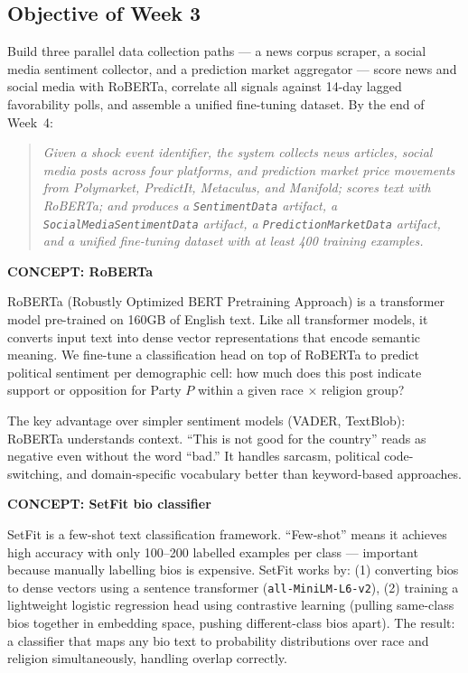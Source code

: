 \documentclass[11pt]{article}
\newcommand{\concept}[2]{%
  \begin{mdframed}[style=conceptbox]
  {\small\bfseries\color{bluefg}CONCEPT: #1}\par\smallskip #2
  \end{mdframed}}
\begin{document}
\subsection*{Objective of Week 3}

Build three parallel data collection paths --- a news corpus scraper, a social media
sentiment collector, and a prediction market aggregator --- score news and social media
with RoBERTa, correlate all signals against 14-day lagged favorability polls, and
assemble a unified fine-tuning dataset. By the end of Week~4:

\begin{quote}
\textit{Given a shock event identifier, the system collects news articles, social media
posts across four platforms, and prediction market price movements from Polymarket,
PredictIt, Metaculus, and Manifold; scores text with RoBERTa; and produces a
\texttt{SentimentData} artifact, a \texttt{SocialMediaSentimentData} artifact, a
\texttt{PredictionMarketData} artifact, and a unified fine-tuning dataset with at
least 400 training examples.}
\end{quote}

\concept{RoBERTa}{
RoBERTa (Robustly Optimized BERT Pretraining Approach) is a transformer model
pre-trained on 160GB of English text. Like all transformer models, it converts
input text into dense vector representations that encode semantic meaning. We
fine-tune a classification head on top of RoBERTa to predict political sentiment
per demographic cell: how much does this post indicate support or opposition for
Party $P$ within a given race $\times$ religion group?

The key advantage over simpler sentiment models (VADER, TextBlob): RoBERTa
understands context. ``This is not good for the country'' reads as negative even
without the word ``bad.'' It handles sarcasm, political code-switching, and
domain-specific vocabulary better than keyword-based approaches.
}

\concept{SetFit bio classifier}{
SetFit is a few-shot text classification framework. ``Few-shot'' means it achieves
high accuracy with only 100--200 labelled examples per class --- important because
manually labelling bios is expensive. SetFit works by: (1) converting bios to
dense vectors using a sentence transformer (\texttt{all-MiniLM-L6-v2}), (2) training
a lightweight logistic regression head using contrastive learning (pulling same-class
bios together in embedding space, pushing different-class bios apart). The result: a
classifier that maps any bio text to probability distributions over race and religion
simultaneously, handling overlap correctly.
}
\end{document}
